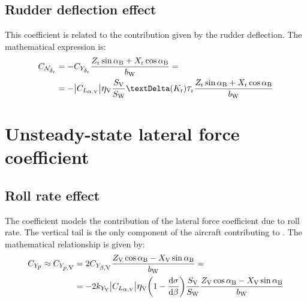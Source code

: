 \subsection{Rudder deflection effect}
\label{subsec2.3.3}

This coefficient is related to the contribution given by the rudder deflection. The mathematical expression is: 
\begin{equation}
\label{eq:yawrudder}
\begin{split}
\CNdeltar & = -\CYdeltar \frac{\ZR\sin\alphaB + \XR \cos\alphaB}{\bW} = \\
& = - \big|\CLalphaV \big| \etaV \frac{\SV}{\SW} \textrm \textDelta (K_{\textrm r}) \taurud \frac{\ZR\sin\alphaB + \XR \cos\alphaB}{\bW}
\end{split}
\end{equation}

\newpage
\section{Unsteady-state lateral force coefficient}
\label{sec2.4}

\subsection{Roll rate effect}
\label{subsec2.4.1}

The coefficient \CYprate models the contribution of the lateral force coefficient due to roll rate. The vertical tail is the only component of the aircraft contributing to \CYprate. The mathematical relationship is given by:
\begin{equation}
\label{eq:sideforcerollrate}
\begin{split}
\CYprate \approx \CYprateV & = 2 \CYbetaV \frac{\ZV \cos\alphaB - \XV\sin\alphaB}{\bW} = \\
& = -2 k_{Y_\textrm V} \big|\CLalphaV \big| \etaV \biggl( 1 - \frac{\mathrm{d}\sigma}{\mathrm{d}\beta} \biggr) \frac{\SV}{\SW} \frac{\ZV \cos\alphaB - \XV\sin\alphaB}{\bW}
\end{split}
\end{equation}

